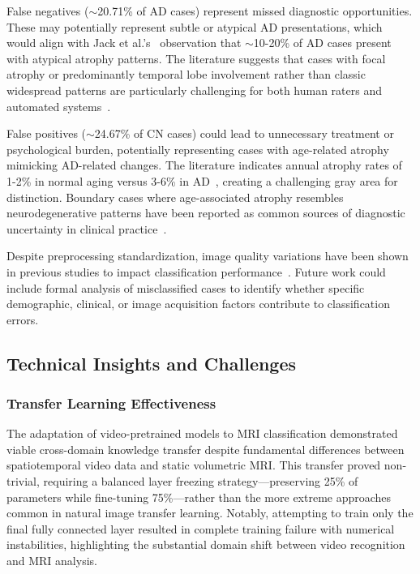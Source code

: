 \documentclass[11pt, a4paper]{article}
\begin{document}
False negatives ($\sim$20.71\% of AD cases) represent missed diagnostic opportunities. These may potentially represent subtle or atypical AD presentations, which would align with Jack et al.'s~\cite{jack2013tracking} observation that $\sim$10-20\% of AD cases present with atypical atrophy patterns. The literature suggests that cases with focal atrophy or predominantly temporal lobe involvement rather than classic widespread patterns are particularly challenging for both human raters and automated systems~\cite{kloppel2008accuracy}.

False positives ($\sim$24.67\% of CN cases) could lead to unnecessary treatment or psychological burden, potentially representing cases with age-related atrophy mimicking AD-related changes. The literature indicates annual atrophy rates of 1-2\% in normal aging versus 3-6\% in AD~\cite{vemuri2010role}, creating a challenging gray area for distinction. Boundary cases where age-associated atrophy resembles neurodegenerative patterns have been reported as common sources of diagnostic uncertainty in clinical practice~\cite{frisoni2010clinical}.

Despite preprocessing standardization, image quality variations have been shown in previous studies to impact classification performance~\cite{davatzikos2019machine}. Future work could include formal analysis of misclassified cases to identify whether specific demographic, clinical, or image acquisition factors contribute to classification errors.

\subsection{Technical Insights and Challenges}

\subsubsection{Transfer Learning Effectiveness}

The adaptation of video-pretrained models to MRI classification demonstrated viable cross-domain knowledge transfer despite fundamental differences between spatiotemporal video data and static volumetric MRI. This transfer proved non-trivial, requiring a balanced layer freezing strategy—preserving 25\% of parameters while fine-tuning 75\%—rather than the more extreme approaches common in natural image transfer learning. Notably, attempting to train only the final fully connected layer resulted in complete training failure with numerical instabilities, highlighting the substantial domain shift between video recognition and MRI analysis.
\end{document}
